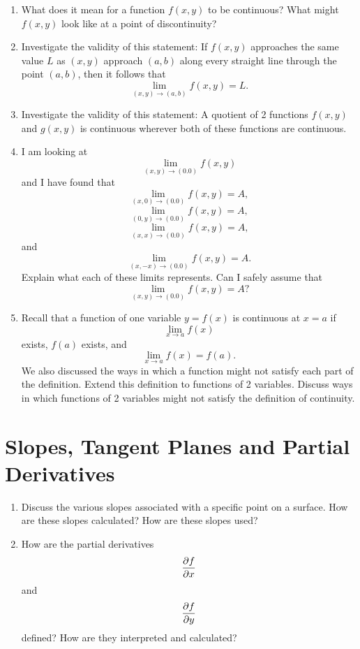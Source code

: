 \begin{enumerate}
\item  What does it mean for a function $f(x, y)$ to be continuous?  What might $f(x, y)$ look like at a point of discontinuity?

\item  Investigate the validity of this statement:  If $f(x, y)$ approaches the same value $L$ as $(x, y)$ approach $(a, b)$ along every straight line through the point $(a, b)$, then it follows that $$\mathop {\lim }\limits_{(x,y) \to (a,b)} f(x,y) = L.$$

\item  Investigate the validity of this statement:  A quotient of 2 functions $f(x, y)$ and $g(x, y)$ is continuous wherever both of these functions are continuous.

\item  I am looking at $$\mathop {\lim }\limits_{(x,y) \to (0.0)} f(x,y)$$ and I have found that 
$$\mathop {\lim }\limits_{(x,0) \to (0.0)} f(x,y) = A,$$  $$\mathop {\lim }\limits_{(0,y) \to (0.0)} f(x,y) = A,$$ $$\mathop {\lim }\limits_{(x,x) \to (0.0)} f(x,y) = A,$$ and $$\mathop {\lim }\limits_{(x, - x) \to (0.0)} f(x,y) = A.$$  
Explain what each of these limits represents.  Can I safely assume that $$\mathop {\lim }\limits_{(x,y) \to (0.0)} f(x,y) = A?$$

\item  Recall that a function of one variable $y = f(x)$ is continuous at $x = a$ if  $$\mathop {\lim }\limits_{x \to a} f(x)$$ exists,  $f(a)$ exists, and  $$\mathop {\lim }\limits_{x \to a} f(x) = f(a).$$  We also discussed the ways in which a function might not satisfy each part of the definition.  Extend this definition to functions of 2 variables.  Discuss ways in which functions of 2 variables might not satisfy the definition of continuity. 

\end{enumerate}\section{Slopes, Tangent Planes and Partial Derivatives}\begin{enumerate}

\item  Discuss the various slopes associated with a specific point on a surface.  How are these slopes calculated?  How are these slopes used?

\item  How are the partial derivatives $${{\partial f} \over {\partial x}}$$ and $${{\partial f} \over {\partial y}}$$ defined?  How are they interpreted and calculated?  \cite{FWG}


\end{enumerate}
